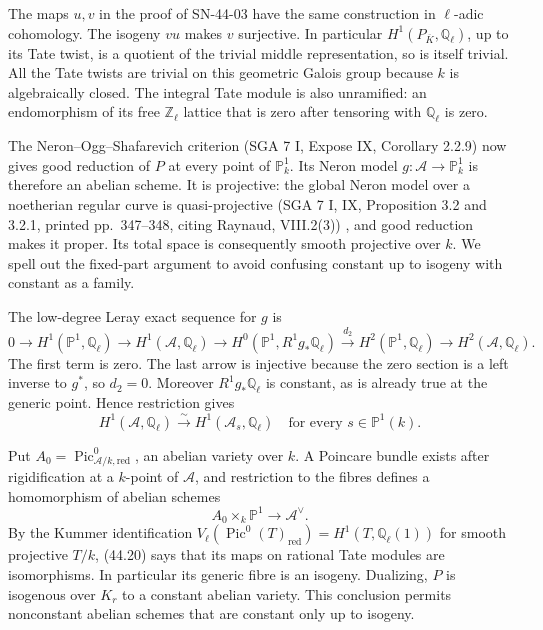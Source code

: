 \documentclass[11pt,a4paper]{article}
\theoremstyle{definition}
\theoremstyle{remark}
\begin{document}
The maps $u,v$ in the proof of SN-44-03 have the same construction
in $\ell$-adic cohomology.  The isogeny $vu$ makes $v$
surjective.  In particular $H^1(P_{\overline K},\mathbb Q_\ell)$,
up to its Tate twist, is a quotient of the trivial middle
representation, so is itself trivial.  All the Tate twists are
trivial on this geometric Galois group because $k$ is algebraically
closed.  The integral Tate module is also unramified: an
endomorphism of its free $\mathbb Z_\ell$ lattice that is zero
after tensoring with $\mathbb Q_\ell$ is zero.

The Neron--Ogg--Shafarevich criterion (SGA 7 I, Expose IX,
Corollary 2.2.9) now gives good reduction of $P$ at every point
of $\mathbb P^1_k$.  Its Neron model
$g:\mathcal A\to\mathbb P^1_k$ is therefore an abelian scheme.
It is projective: the global Neron model over a noetherian regular
curve is quasi-projective (SGA 7 I, IX, Proposition 3.2 and
3.2.1, printed pp.~347--348, citing Raynaud, VIII.2(3))
\cite{SGA7IHeight}, and good reduction makes it
proper.  Its total space is consequently smooth projective over
$k$.  We spell out the fixed-part argument to avoid confusing
constant up to isogeny with constant as a family.

The low-degree Leray exact sequence for $g$ is
\[
0\longrightarrow H^1(\mathbb P^1,\mathbb Q_\ell)
 \longrightarrow H^1(\mathcal A,\mathbb Q_\ell)
 \longrightarrow H^0(\mathbb P^1,R^1g_*\mathbb Q_\ell)
 \xrightarrow{d_2}H^2(\mathbb P^1,\mathbb Q_\ell)
 \longrightarrow H^2(\mathcal A,\mathbb Q_\ell).
\]
The first term is zero.  The last arrow is injective because the
zero section is a left inverse to $g^*$, so $d_2=0$.
Moreover $R^1g_*\mathbb Q_\ell$ is constant, as is already true
at the generic point.  Hence restriction gives
\[
 H^1(\mathcal A,\mathbb Q_\ell)
   \xrightarrow{\sim}H^1(\mathcal A_s,\mathbb Q_\ell)
 \quad\text{for every }s\in\mathbb P^1(k).                 \tag{44.20}
\]

Put $A_0=\operatorname{Pic}^0_{\mathcal A/k,\mathrm{red}}$,
an abelian variety over $k$.  A Poincare bundle exists after
rigidification at a $k$-point of $\mathcal A$, and restriction
to the fibres defines a homomorphism of abelian schemes
\[
 A_0\times_k\mathbb P^1\longrightarrow\mathcal A^\vee.
\]
By the Kummer identification
$V_\ell(\operatorname{Pic}^0(T)_{\mathrm{red}})
 =H^1(T,\mathbb Q_\ell(1))$ for smooth projective $T/k$,
(44.20) says that its maps on rational Tate modules are
isomorphisms.  In particular its generic fibre is an isogeny.
Dualizing, $P$ is isogenous over $K_r$ to a constant abelian
variety.  This conclusion permits nonconstant abelian schemes
that are constant only up to isogeny.
\end{document}
